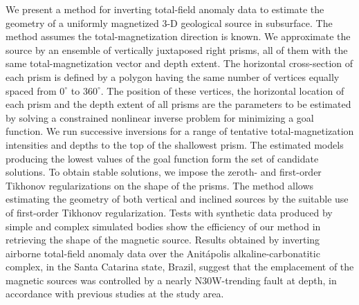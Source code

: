 \begin{summary}
We present a method for inverting total-field anomaly data to estimate the geometry of 
a uniformly magnetized 3-D geological source in subsurface. The method assumes 
the total-magnetization direction is known. We approximate the source by an 
ensemble of vertically juxtaposed right prisms, all of them with the same 
total-magnetization vector and depth extent. The horizontal cross-section 
of each prism is defined by a polygon having the same number of vertices 
equally spaced from $0^{\circ}$ to $360^{\circ}$. The position of these 
vertices, the horizontal location of each prism and the depth extent of all prisms 
are the parameters to be estimated by solving a constrained nonlinear inverse problem 
for minimizing a goal function. 
We run successive inversions for a range of tentative total-magnetization intensities 
and depths to the top of the shallowest prism. The estimated models producing 
the lowest values of the goal function form the set of candidate solutions.
To obtain stable solutions, we impose the zeroth- and first-order Tikhonov 
regularizations on the shape of the prisms. The method allows estimating the geometry 
of both vertical and inclined sources by the suitable use of first-order Tikhonov 
regularization. Tests with synthetic data produced by simple and complex simulated 
bodies show the efficiency of our method in retrieving the shape of the magnetic 
source. Results obtained by inverting airborne total-field anomaly data over the 
Anit{\'a}polis alkaline-carbonatitic complex, in the Santa Catarina state, Brazil, 
suggest that the emplacement of the magnetic sources was controlled by a nearly 
N30W-trending fault at depth, in accordance with previous studies at the study area.
\end{summary}